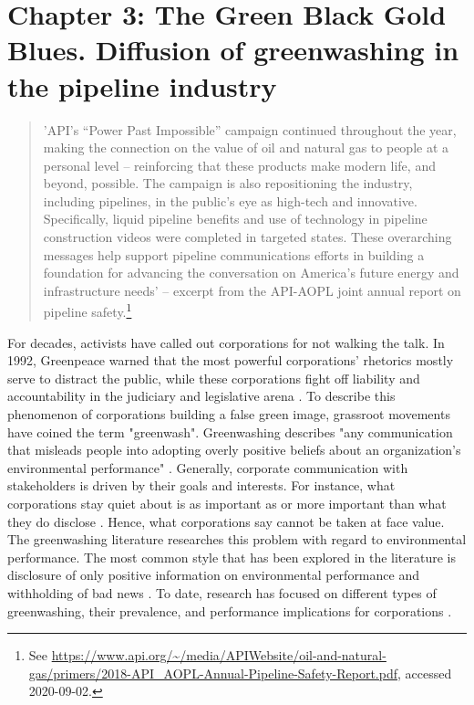 \section{Chapter 3: The Green Black Gold Blues. Diffusion of greenwashing in the pipeline industry}

\begin{quote}
	'API’s “Power Past Impossible” campaign continued throughout the year, making the connection on the value of oil and natural gas to people at a personal level – reinforcing that these products make modern life, and beyond, possible.  The campaign is also repositioning the industry, including pipelines, in the public’s eye as high-tech and innovative. Specifically, liquid pipeline benefits and use of technology in pipeline construction videos were completed in targeted states. These overarching messages help support pipeline communications efforts in building a foundation for advancing the conversation on America’s future energy and infrastructure needs' -- excerpt from the API-AOPL joint annual report on pipeline safety.\footnote{See \url{https://www.api.org/~/media/APIWebsite/oil-and-natural-gas/primers/2018-API_AOPL-Annual-Pipeline-Safety-Report.pdf}, accessed 2020-09-02.}
\end{quote}

For decades, activists have called out corporations for not walking the talk. In 1992, Greenpeace warned that the most powerful corporations' rhetorics mostly serve to distract the public, while these corporations fight off liability and accountability in the judiciary and legislative arena \citep{Bruno1992}. To describe this phenomenon of corporations building a false green image, grassroot movements have coined the term "greenwash". Greenwashing describes "any communication that misleads people into adopting overly positive beliefs about an organization's environmental performance" \citep[p. 225]{Lyon2015}. Generally, corporate communication with stakeholders is driven by their goals and interests. For instance, what corporations stay quiet about is as important as or more important than what they do disclose \citep{Kim2015}. Hence, what corporations say cannot be taken at face value. The greenwashing literature researches this problem with regard to environmental performance. The most common style that has been explored in the literature is disclosure of only positive information on environmental performance and withholding of bad news \citep{Lyon2011}. To date, research has focused on different types of greenwashing, their prevalence, and performance implications for corporations \citep{Marquis2016, Ramus2005, Seele2017, Kassinis2018}.

